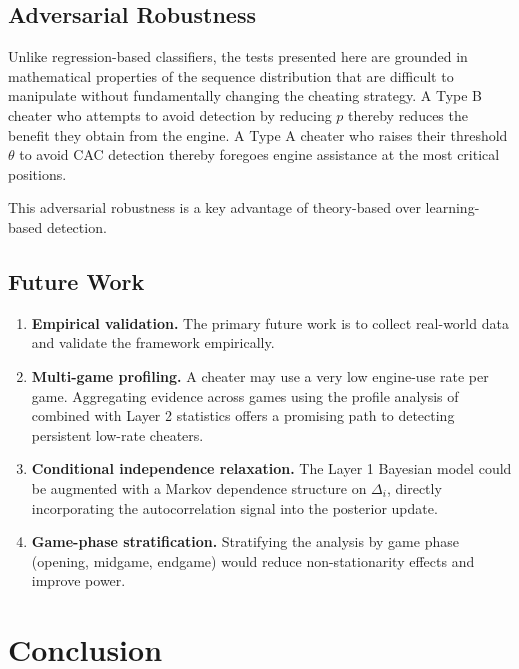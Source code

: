 \documentclass[11pt,a4paper]{article}
\begin{document}
\subsection{Adversarial Robustness}

Unlike regression-based classifiers, the tests presented here are grounded
in mathematical properties of the sequence distribution that are difficult
to manipulate without fundamentally changing the cheating strategy.
A Type B cheater who attempts to avoid detection by reducing $p$ thereby
reduces the benefit they obtain from the engine. A Type A cheater who
raises their threshold $\theta$ to avoid CAC detection thereby foregoes
engine assistance at the most critical positions.

This adversarial robustness is a key advantage of theory-based over
learning-based detection.

\subsection{Future Work}
\label{sec:future}

\begin{enumerate}[label=(\roman*)]
\item \textbf{Empirical validation.} The primary future work is to collect
  real-world data and validate the framework empirically.

\item \textbf{Multi-game profiling.} A cheater may use a very low engine-use
  rate per game. Aggregating evidence across games using the profile analysis
  of \citet{nguyen2025bayesian} combined with Layer 2 statistics offers
  a promising path to detecting persistent low-rate cheaters.

\item \textbf{Conditional independence relaxation.} The Layer 1 Bayesian
  model could be augmented with a Markov dependence structure on $\Delta_i$,
  directly incorporating the autocorrelation signal into the posterior update.

\item \textbf{Game-phase stratification.} Stratifying the analysis by game
  phase (opening, midgame, endgame) would reduce non-stationarity effects
  and improve power.
\end{enumerate}

\section{Conclusion}
\label{sec:conclusion}
\end{document}
